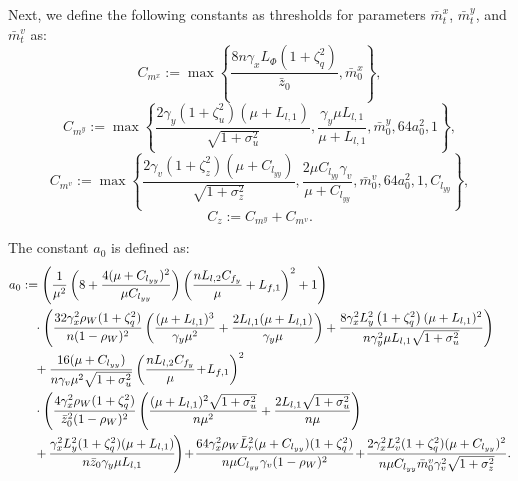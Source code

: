 \documentclass{article}
\theoremstyle{plain}
\theoremstyle{definition}
\theoremstyle{remark}
\begin{document}
Next, we define the following constants as thresholds for parameters \(\bar{m}_{t}^x\), \(\bar{m}_{t}^y\), and \(\bar{m}_{t}^v\) as:
\begin{equation}
    C_{m^x} := \max \left\{ \frac{8n\gamma_x L_\Phi \left(1 +\zeta_q^2\right)}{\bar{z}_0}, \bar{m}^x_0\right\},\label{eq52}
\end{equation}
\begin{equation}
   C_{m^y} := \max \left\{ \frac{2\gamma_y(1+\zeta_u^2)(\mu + L_{l,1})}{\sqrt{1+\sigma_u^2}}, \frac{\gamma_y \mu L_{l,1} }{\mu + L_{l,1}}, \bar{m}^y_0, 64 a_0^2, 1 \right\}, \label{eq53}
\end{equation}
\begin{equation}
   C_{m^v} := \max \left\{ \frac{2\gamma_v(1+\zeta_z^2)(\mu + C_{l_{yy}})}{\sqrt{1+\sigma_z^2}}, \frac{2\mu C_{l_{yy}}\gamma_v}{\mu + C_{l_{yy}}}, \bar{m}^v_0, 64 a_0^2, 1, C_{l_{yy}} \right\}, \label{eq54}
\end{equation}
\begin{equation}
    C_{z} := C_{m^y} + C_{m^v}.\label{eq55}
\end{equation}

The constant \(a_0\) is defined as:
\begin{align}
a_0 &:= \left( \frac{1}{\mu^2}\left(8+\frac{4(\mu + C_{l_{yy}})^2}{\mu C_{l_{yy}}} \right)\left(\frac{nL_{l,2}C_{f_y}}{\mu}+L_{f,1}\right)^2+1\right)  \notag \\
&\quad \cdot\left(\frac{32 \gamma_x^2 \rho_W(1 + \zeta_q^2)}{n(1 - \rho_W)^2} \left(\frac{(\mu+L_{l,1})^3}{\gamma_y\mu^2}+\frac{2L_{l,1}(\mu+L_{l,1})}{\gamma_y\mu}\right)+\frac{8\gamma_x^2  L_y^2\left( 1 + \zeta_q^2 \right) (\mu + L_{l,1})^2}{n\gamma_y^2\mu L_{l,1}\sqrt{1+\sigma_u^2}}\right)\nonumber\\
&\quad +\frac{16(\mu + C_{l_{yy}})}{n\gamma_v\mu^2\sqrt{1+\sigma_u^2}}\left(\frac{nL_{l,2}C_{f_y}}{\mu}\!+\!L_{f,1}\right)^2\nonumber\\
&\quad\cdot\left(\frac{4 \gamma_x^2 \rho_W (1 + \zeta_q^2)}{\bar{z}_0^2(1 - \rho_W)^2} \left(\frac{(\mu+L_{l,1})^2\sqrt{1+\sigma_u^2}}{n\mu^2 }+\frac{2L_{l,1}\sqrt{1+\sigma_u^2}}{n\mu }\right)\right.\nonumber\\
&\quad +\!\left.\frac{\gamma_x^2L_y^2(1+\zeta_q^2)(\mu + L_{l,1})}{n\bar{z}_0\gamma_y \mu L_{l,1}}\!\right)
\!+ \!\frac{64 \gamma_x^2 \rho_W \bar{L}_r^2(\mu + C_{l_{yy}})(1 + \zeta_q^2)}{n\mu C_{l_{yy}}\gamma_v(1 - \rho_W)^2}\! +\! \frac{2\gamma_x^2L_v^2(1+\zeta_q^2)(\mu + C_{l_{yy}})^2}{n\mu C_{l_{yy}}\bar{m}_0^v\gamma_v^2\sqrt{1+\sigma_z^2}}.\label{eq56}
\end{align}
\end{document}
